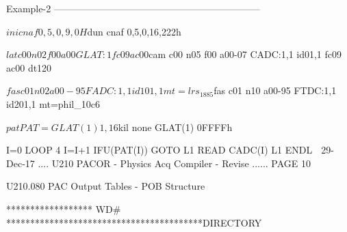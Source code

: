    Example-2 -----------------------------------------------------------------
 
   $ini cnaf 0,5,0,9,0H
 
   $dun cnaf 0,5,0,16,222h
 
   $lat c00 n02 f00 a00    GLAT:1              fc09 ac00
 
   $cam c00 n05 f00 a00-07 CADC:1,1  id01,1    fc09 ac00   dt120
 
   $fas c01 n02 a00-95     FADC:1,1  id101,1   mt=lrs_1885
 
   $fas c01 n10 a00-95     FTDC:1,1  id201,1   mt=phil_10c6
 
   $pat PAT = GLAT(1)1,16
 
   $kil none GLAT(1) 0FFFFh
 
         I=0
         LOOP 4
         I=I+1
         IFU(PAT(I)) GOTO L1
         READ CADC(I)
   L1    ENDL
    
   29-Dec-17 .... U210  PACOR -  Physics Acq Compiler - Revise ...... PAGE  10
 
 
   U210.080  PAC Output Tables - POB Structure
 
   ******************  WD#  *****************************************DIRECTORY
 
